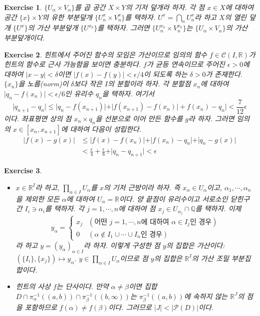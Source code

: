 \documentclass{article}
\newtheorem{exercise}{Exercise}[section]
\newcommand{\Q}{\mathbb{Q}}
\newcommand{\R}{\mathbb{R}}
\begin{document}
\begin{exercise}
    $\{U_\alpha\times V_\alpha\}$를 곱 공간 $X\times Y$의 기저 덮개라 하자. 각 점 $x\in X$에 대하여 공간 $\{x\}\times Y$의 유한 부분덮개 $\{U_n^x\times V_n^x\}$를 택하자. $U^x=\bigcap_nU_n^x$라 하고 $X$의 열린 덮개 $\{U^x\}$의 가산 부분덮개 $\{U^{x_k}\}$를 택하자. 그러면 $\{U_n^{x_k}\times V_n^{x_k}\}$는 $\{U_\alpha\times V_\alpha\}$의 가산 부분덮개이다. 
\end{exercise}

\begin{exercise}
    힌트에서 주어진 함수의 모임은 가산이므로 임의의 함수 $f\in\mathcal C(I,\R)$가 힌트의 함수로 근사 가능함을 보이면 충분하다. $f$가 균등 연속이므로 주어진 $\epsilon>0$에 대하여 $\vert x-y\vert<\delta$이면 $\vert f(x)-f(y)\vert<\epsilon/4$이 되도록 하는 $\delta>0$가 존재한다. $\{x_n\}$을 노름(norm)이 $\delta$보다 작은 $I$의 분할이라 하자. 각 분할점 $x_n$에 대하여 $\vert q_n-f(x_n)\vert<\epsilon/6$인 유리수 $q_n$을 택하자. 여기서
    \[
        \vert q_{n+1}-q_n\vert\leq\vert q_n-f(x_{n+1})\vert+\vert f(x_{n+1})-f(x_n)\vert+f(x_n)-q_n\vert<\frac{7}{12}\epsilon
    \]
    이다. 좌표평면 상의 점 $x_n\times q_n$을 선분으로 이어 만든 함수를 $g$라 하자. 그러면 임의의 $x\in[x_n,x_{n+1}]$에 대하여 다음이 성립한다.
    \begin{align*}
        \vert f(x)-g(x)\vert&\leq\vert f(x)-f(x_n)\vert+\vert f(x_n)-q_n\vert+\vert q_n-g(x)\vert\\[3pt]
        &<\frac{\epsilon}{4}+\frac{\epsilon}{6}+\vert q_n-q_{n+1}\vert<\epsilon
    \end{align*}
\end{exercise}

\begin{exercise}
    \phantom{}
    \begin{itemize}
        \item[(a)] $x\in\R^I$라 하고, $\prod_{\alpha\in I}U_\alpha$를 $x$의 기저 근방이라 하자. 즉 $x_\alpha\in U_\alpha$이고, $\alpha_1,\cdots,\alpha_n$을 제외한 모든 $\alpha$에 대하여 $U_\alpha=\R$이다. 양 끝점이 유리수이고 서로소인 닫힌구간 $I_i\ni\alpha_i$를 택하자. 각 $j=1,\cdots,n$에 대하여 점 $x_j\in U_{\alpha_j}\cap\Q$를 택하자. 이제
        \[
            y_\alpha=\begin{cases}
                x_j & (\text{어떤 }j=1,\cdots,n\text{에 대하여 } \alpha\in I_j\text{인 경우})\\
                0 & (\alpha\notin I_1\cup\cdots\cup I_n\text{인 경우})
            \end{cases}
        \]
        라 하고 $y=(y_\alpha)_{\alpha\in I}$라 하자. 이렇게 구성한 점 $y$의 집합은 가산이다: $(\{I_i\},\{x_j\})\mapsto y_\alpha$. $y\in\prod_{\alpha\in I}U_\alpha$이므로 점 $y$의 집합은 $\R^I$의 가산 조밀 부분집합이다.
        \item[(b)] 힌트의 사상 $f$는 단사이다. 만약 $\alpha\ne\beta$이면 집합 $D\cap\pi_\alpha^{-1}((a,b))\cap\pi_\beta^{-1}((b,\infty))$는 $\pi_\beta^{-1}((a,b))$에 속하지 않는 $\R^J$의 점을 포함하므로 $f(\alpha)\ne f(\beta)$이다. 그러므로 $\vert J\vert<\vert\mathcal{P}(D)\vert$이다.
    \end{itemize}
\end{exercise}
\end{document}
